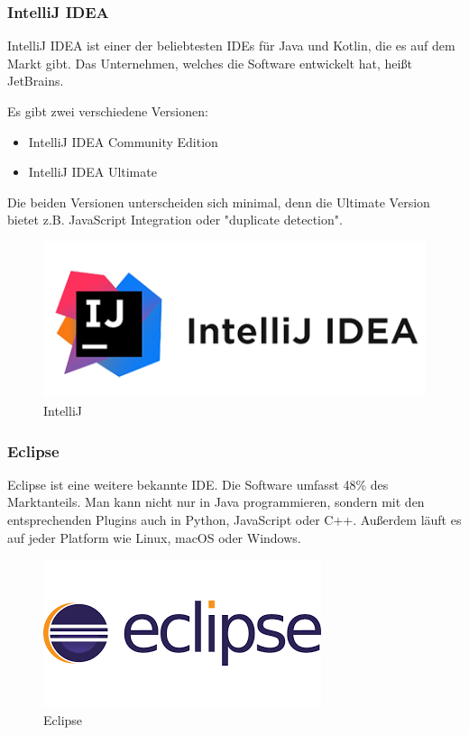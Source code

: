\newpage
\subsubsection{IntelliJ IDEA}

IntelliJ IDEA ist einer der beliebtesten IDEs für Java und Kotlin, die es auf dem Markt gibt. Das Unternehmen, welches die Software entwickelt hat, heißt JetBrains. 

Es gibt zwei verschiedene Versionen:
\begin{itemize}
	\item IntelliJ IDEA Community Edition
	\item IntelliJ IDEA Ultimate
\end{itemize}

Die beiden Versionen unterscheiden sich minimal, denn die Ultimate Version bietet z.B. JavaScript Integration oder "duplicate detection".

\begin{figure} [H]
	\centering
	\includegraphics[width=0.5\linewidth]{images/intelliJ.png}
	\caption[IntelliJ]{IntelliJ}
	\vspace{1cm}
	\label{fig:IntelliJ}
\end{figure}

\subsubsection{Eclipse}

Eclipse ist eine weitere bekannte IDE. Die Software umfasst 48\% des Marktanteils. Man kann nicht nur in Java programmieren, sondern mit den entsprechenden Plugins auch in Python, JavaScript oder C++. Außerdem läuft es auf jeder Platform wie Linux, macOS oder Windows. \parencite{Eclipse}

\begin{figure}[H]
	\centering
	\includegraphics[width=0.5\linewidth]{images/eclipse.png}
	\caption[Eclipse]{Eclipse}
	\label{fig:Eclipse}
\end{figure}

